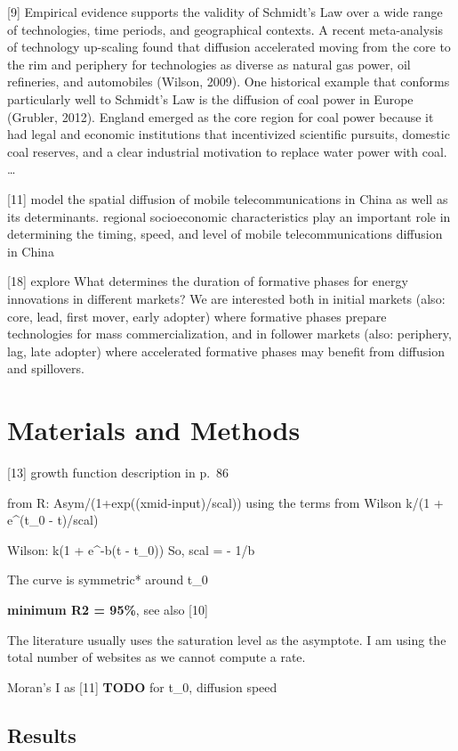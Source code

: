 \documentclass[10pt,letterpaper]{article}
\begin{document}
{[}9{]} Empirical evidence supports the validity of Schmidt's Law over a
wide range of technologies, time periods, and geographical contexts. A
recent meta-analysis of technology up-scaling found that diffusion
accelerated moving from the core to the rim and periphery for
technologies as diverse as natural gas power, oil refineries, and
automobiles (Wilson, 2009). One historical example that conforms
particularly well to Schmidt's Law is the diffusion of coal power in
Europe (Grubler, 2012). England emerged as the core region for coal
power because it had legal and economic institutions that incentivized
scientific pursuits, domestic coal reserves, and a clear industrial
motivation to replace water power with coal. \ldots{}

{[}11{]} model the spatial diffusion of mobile telecommunications in
China as well as its determinants. regional socioeconomic
characteristics play an important role in determining the timing, speed,
and level of mobile telecommunications diffusion in China

{[}18{]} explore What determines the duration of formative phases for
energy innovations in different markets? We are interested both in
initial markets (also: core, lead, first mover, early adopter) where
formative phases prepare technologies for mass commercialization, and in
follower markets (also: periphery, lag, late adopter) where accelerated
formative phases may benefit from diffusion and spillovers.

\hypertarget{sec3}{%
\section{Materials and Methods}\label{sec3}}

{[}13{]} growth function description in p.~86

from R: Asym/(1+exp((xmid-input)/scal)) using the terms from Wilson k/(1
+ e\^{}(t\_0 - t)/scal)

Wilson: k(1 + e\^{}-b(t - t\_0)) So, scal = - 1/b

The curve is symmetric* around t\_0

\textbf{minimum R2 = 95\%}, see also {[}10{]}

The literature usually uses the saturation level as the asymptote. I am
using the total number of websites as we cannot compute a rate.

Moran's I as {[}11{]} \textbf{TODO} for t\_0, diffusion speed

\hypertarget{sec3.1}{%
\subsection{Results}\label{sec3.1}}
\end{document}
